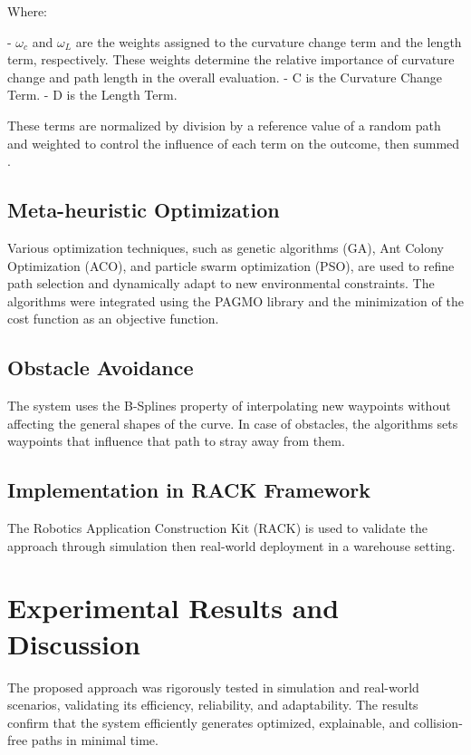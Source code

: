 \documentclass{amam}                %
\begin{document}
\noindent Where:

\noindent - \(\omega_c\) and \(\omega_L\) are the weights assigned to the curvature change term and the length term, 
    respectively. These weights determine the relative importance of curvature change and path length in the overall evaluation. 
\newline - C is the Curvature Change Term.
\newline - D is the Length Term.

These terms are normalized by division by a reference value of a random path and weighted to control the influence of each term on the outcome, then summed \cite{ref3}.

\subsection{Meta-heuristic Optimization}
Various optimization techniques, such as genetic algorithms (GA), Ant Colony Optimization (ACO), and particle swarm optimization (PSO), are used to refine path selection and dynamically adapt to new environmental constraints. The algorithms were integrated using the PAGMO library and the minimization of the cost function as an objective function.
\subsection{Obstacle Avoidance}
The system uses the B-Splines property of interpolating new waypoints without affecting the general shapes of the curve. In case of obstacles, the algorithms sets waypoints that influence that path to stray away from them. 
\subsection{Implementation in RACK Framework}
The Robotics Application Construction Kit (RACK) is used to validate the approach through simulation then real-world deployment in a warehouse setting.


\section{Experimental Results and Discussion}
The proposed approach was rigorously tested in simulation and real-world scenarios, validating its efficiency, reliability, and adaptability. The results confirm that the system efficiently generates optimized, explainable, and collision-free paths in minimal time.
\end{document}
